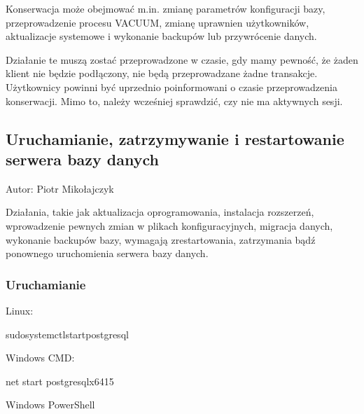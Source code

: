 \documentclass[letterpaper,10pt,polish]{sphinxmanual}
\begin{document}
\sphinxAtStartPar
Konserwacja może obejmować m.in. zmianę parametrów konfiguracji bazy, przeprowadzenie procesu VACUUM, zmianę uprawnien użytkowników, aktualizacje systemowe i wykonanie backupów lub przywrócenie danych.

\sphinxAtStartPar
Działanie te muszą zostać przeprowadzone w czasie, gdy mamy pewność, że żaden klient nie będzie podłączony, nie będą przeprowadzane żadne transakcje. Użytkownicy powinni być uprzednio poinformowani o czasie przeprowadzenia konserwacji. Mimo to, należy wcześniej sprawdzić, czy nie ma aktywnych sesji.


\subsection{Uruchamianie, zatrzymywanie i restartowanie serwera bazy danych}
\label{\detokenize{rozdzial2/Kontrola_i_konserwacja/kontrola_i_konserwacja:uruchamianie-zatrzymywanie-i-restartowanie-serwera-bazy-danych}}
\sphinxAtStartPar
Autor: Piotr Mikołajczyk

\sphinxAtStartPar
Działania, takie jak aktualizacja oprogramowania, instalacja rozszerzeń, wprowadzenie pewnych zmian w plikach konfiguracyjnych, migracja danych, wykonanie backupów bazy, wymagają zrestartowania, zatrzymania bądź ponownego uruchomienia serwera bazy danych.


\subsubsection{Uruchamianie}
\label{\detokenize{rozdzial2/Kontrola_i_konserwacja/kontrola_i_konserwacja:uruchamianie}}
\sphinxAtStartPar
Linux:

\begin{sphinxVerbatim}[commandchars=\\\{\}]
sudosystemctlstartpostgresql
\end{sphinxVerbatim}

\sphinxAtStartPar
Windows CMD:

\begin{sphinxVerbatim}[commandchars=\\\{\}]
net start postgresql\PYGZhy{}x64\PYGZhy{}15
\end{sphinxVerbatim}

\sphinxAtStartPar
Windows PowerShell

\begin{sphinxVerbatim}[commandchars=\\\{\}]
  
\end{sphinxVerbatim}
\end{document}
